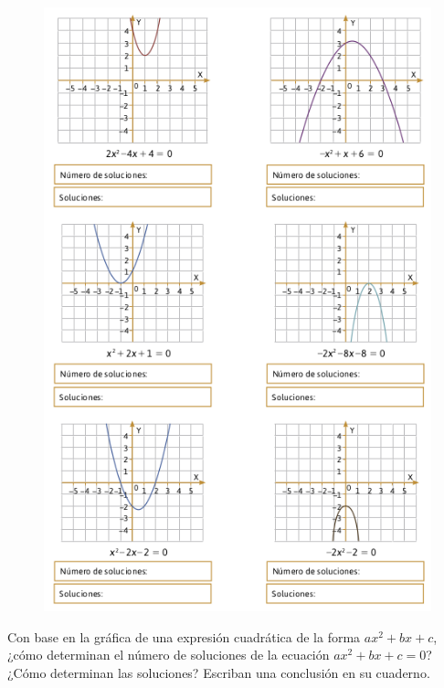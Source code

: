 \documentclass[11pt]{book}
\begin{document}
\begin{enumerate}
          \begin{figure}[H]
              \centering
              \includegraphics[width=0.8\linewidth]{paraboles2.6.png}
              \label{fig:paraboles2.6}
          \end{figure}

          Con base en la gráfica de una expresión cuadrática de
          la forma $ax^2 + bx + c$, ¿cómo determinan el número de soluciones de la
          ecuación $ax^2 + bx + c = 0$? ¿Cómo determinan las soluciones? Escriban
          una conclusión en su cuaderno.
\end{enumerate}
\end{document}
